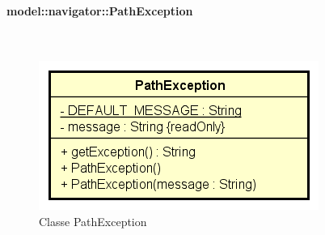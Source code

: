 \documentclass[../DefinizioneDiProdotto.tex]{subfiles}
\begin{document}
\paragraph{model::navigator::PathException}
\
\begin{figure}[H]
	\centering
	\includegraphics[width=\maxwidth]{img/PathException.png}
	\caption{Classe PathException}\label{fig:model::navigator::PathException} 
\end{figure}
\end{document}
